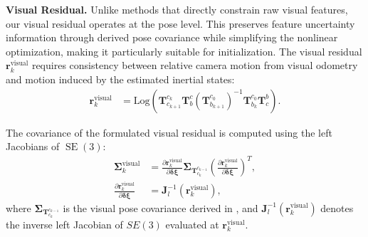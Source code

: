 \noindent \textbf{Visual Residual.} Unlike methods that directly constrain raw visual features, our visual residual operates at the pose level. This preserves feature uncertainty information through derived pose covariance while simplifying the nonlinear optimization, making it particularly suitable for initialization. The visual residual $\mathbf{r}^{\text{visual}}_k$ requires consistency between relative camera motion from visual odometry and motion induced by the estimated inertial states:
\begin{equation}
\begin{aligned}
\mathbf{r}^{\text{visual}}_k &= 
\text{Log}(\mathbf{T}^{c_k}_{c_{k+1}} \mathbf{T}^c_b (\mathbf{T}^{c_0}_{b_{k+1}})^{-1}\mathbf{T}^{c_0}_{b_k}\mathbf{T}^b_c).
\end{aligned}
\end{equation}

The covariance of the formulated visual residual is computed using the left Jacobians of $\operatorname{SE}(3)$: 
\begin{equation}
\begin{aligned}
\bm{\Sigma}^{\text{visual}}_k &= \frac{\partial{\mathbf{r}^\text{visual}_k}}{\partial{\bm{\delta \xi}}} \bm{\Sigma}_{\mathbf{T}^{c_{k-1}}_{c_k}} (\frac{\partial{\mathbf{r}^\text{visual}_k}}{\partial{\bm{\delta \xi}}})^{T},\\
\frac{\partial{\mathbf{r}^\text{visual}_k}}{\partial{\bm{\delta \xi}}} &= \mathbf{J}^{-1}_l(\mathbf{r}^\text{visual}_k),
\end{aligned}
\end{equation}
where $\bm{\Sigma}_{\mathbf{T}^{c_{k-1}}_{c_k}}$ is the visual pose covariance derived in , and $\mathbf{J}^{-1}_l(\mathbf{r}^\text{visual}_k)$ denotes the inverse left Jacobian of $SE(3)$ evaluated at $\mathbf{r}^{\text{visual}}_k$.

